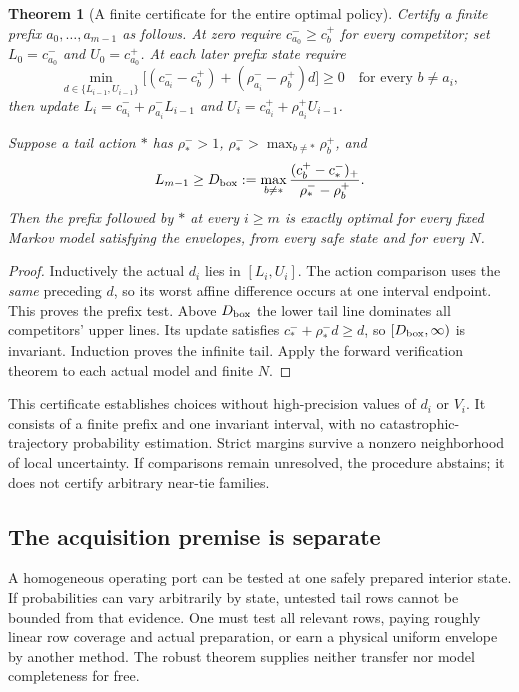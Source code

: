 \documentclass[10pt,a4paper]{article}
\newtheorem{theorem}{Theorem}\newtheorem{proposition}{Proposition}
\begin{document}
\begin{theorem}[A finite certificate for the entire optimal policy]
Certify a finite prefix $a_0,\ldots,a_{m-1}$ as follows. At zero require
$c_{a_0}^-\ge c_b^+$ for every competitor; set
$L_0=c_{a_0}^-$ and $U_0=c_{a_0}^+$. At each later prefix state require
\begin{equation}
\min_{d\in\{L_{i-1},U_{i-1}\}}
\big[(c_{a_i}^--c_b^+)+(\rho_{a_i}^--\rho_b^+)d\big]\ge0
\quad\text{for every }b\ne a_i,
\label{eq:prefix}
\end{equation}
then update $L_i=c_{a_i}^-+\rho_{a_i}^-L_{i-1}$ and
$U_i=c_{a_i}^++\rho_{a_i}^+U_{i-1}$.

Suppose a tail action $*$ has $\rho_*^->1$,
$\rho_*^->\max_{b\ne *}\rho_b^+$, and
\begin{equation}
L_{m-1}\ge D_{\rm box}:=
\max_{b\ne *}\frac{(c_b^+-c_*^-)_+}{\rho_*^--\rho_b^+}.
\label{eq:cone}
\end{equation}
Then the prefix followed by $*$ at every $i\ge m$ is exactly optimal for every fixed Markov model satisfying the envelopes, from every safe state and for every $N$.
\end{theorem}

\begin{proof}
Inductively the actual $d_i$ lies in $[L_i,U_i]$. The action comparison uses the \emph{same} preceding $d$, so its worst affine difference occurs at one interval endpoint. This proves the prefix test. Above $D_{\rm box}$ the lower tail line dominates all competitors' upper lines. Its update satisfies $c_*^-+\rho_*^-d\ge d$, so $[D_{\rm box},\infty)$ is invariant. Induction proves the infinite tail. Apply the forward verification theorem to each actual model and finite $N$.
\end{proof}

This certificate establishes choices without high-precision values of $d_i$ or $V_i$. It consists of a finite prefix and one invariant interval, with no catastrophic-trajectory probability estimation. Strict margins survive a nonzero neighborhood of local uncertainty. If comparisons remain unresolved, the procedure abstains; it does not certify arbitrary near-tie families.

\subsection{The acquisition premise is separate}

A homogeneous operating port can be tested at one safely prepared interior state. If probabilities can vary arbitrarily by state, untested tail rows cannot be bounded from that evidence. One must test all relevant rows, paying roughly linear row coverage and actual preparation, or earn a physical uniform envelope by another method. The robust theorem supplies neither transfer nor model completeness for free.
\end{document}
